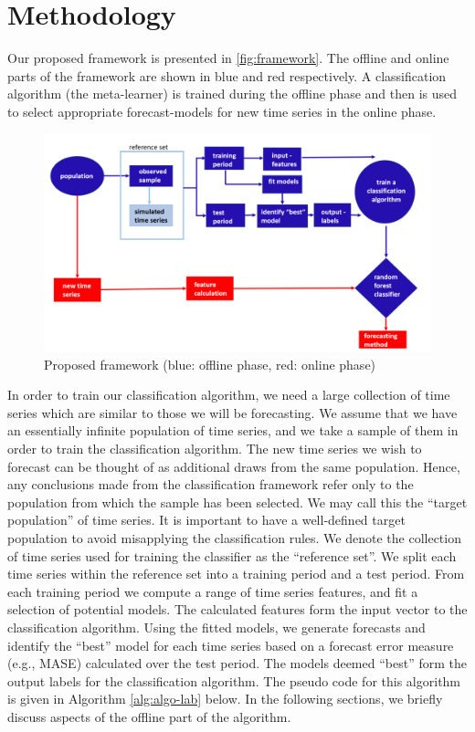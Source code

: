 \documentclass[11pt,a4paper,]{article}
\theoremstyle{definition}
\theoremstyle{definition}
\theoremstyle{definition}
\theoremstyle{remark}
\begin{document}
\section{Methodology}\label{methodology}

Our proposed framework is presented in \autoref{fig:framework}. The
offline and online parts of the framework are shown in blue and red
respectively. A classification algorithm (the meta-learner) is trained
during the offline phase and then is used to select appropriate
forecast-models for new time series in the online phase.

\begin{figure}

{\centering \includegraphics[width=\textwidth]{figures/framework} 

}

\caption{Proposed framework (blue: offline phase, red: online phase)}\label{fig:framework}
\end{figure}

In order to train our classification algorithm, we need a large
collection of time series which are similar to those we will be
forecasting. We assume that we have an essentially infinite population
of time series, and we take a sample of them in order to train the
classification algorithm. The new time series we wish to forecast can be
thought of as additional draws from the same population. Hence, any
conclusions made from the classification framework refer only to the
population from which the sample has been selected. We may call this the
``target population'' of time series. It is important to have a
well-defined target population to avoid misapplying the classification
rules. We denote the collection of time series used for training the
classifier as the ``reference set''. We split each time series within
the reference set into a training period and a test period. From each
training period we compute a range of time series features, and fit a
selection of potential models. The calculated features form the input
vector to the classification algorithm. Using the fitted models, we
generate forecasts and identify the ``best'' model for each time series
based on a forecast error measure (e.g., MASE) calculated over the test
period. The models deemed ``best'' form the output labels for the
classification algorithm. The pseudo code for this algorithm is given in
Algorithm \autoref{alg:algo-lab} below. In the following sections, we
briefly discuss aspects of the offline part of the algorithm.
\end{document}
